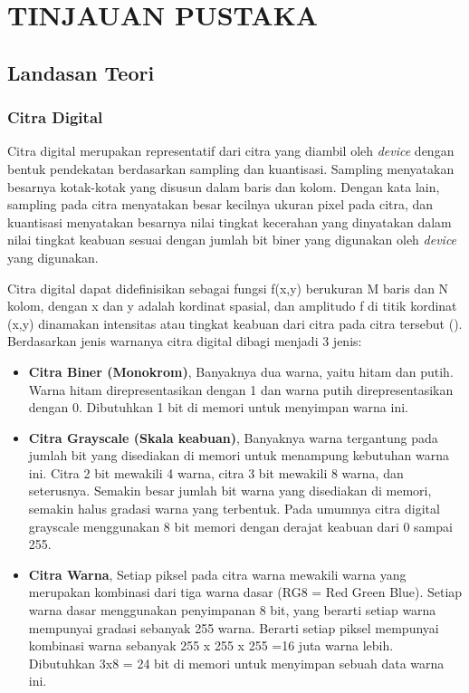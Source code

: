 
\chapter{TINJAUAN PUSTAKA}

\section{Landasan Teori}

\subsection{Citra Digital}
Citra digital merupakan representatif dari citra yang diambil oleh \textit{device} dengan bentuk pendekatan berdasarkan sampling dan kuantisasi. Sampling menyatakan besarnya kotak-kotak yang disusun dalam baris dan kolom. Dengan kata lain, sampling pada citra menyatakan besar kecilnya ukuran pixel pada citra, dan kuantisasi menyatakan besarnya nilai tingkat kecerahan yang dinyatakan dalam nilai tingkat keabuan sesuai dengan jumlah bit biner yang digunakan oleh \textit{device} yang digunakan. 

Citra digital dapat didefinisikan sebagai fungsi f(x,y) berukuran M baris dan N kolom, dengan x dan y adalah kordinat spasial, dan amplitudo f di titik kordinat (x,y) dinamakan intensitas atau tingkat keabuan dari citra pada citra tersebut (\cite{book:darma}). Berdasarkan jenis warnanya citra digital dibagi menjadi 3 jenis:

\begin{itemize}
    \item \textbf{Citra Biner (Monokrom)}, Banyaknya dua warna, yaitu hitam dan putih. Warna hitam direpresentasikan dengan 1 dan warna putih direpresentasikan dengan 0. Dibutuhkan 1 bit di memori untuk menyimpan warna ini.
    \item \textbf{Citra Grayscale (Skala keabuan)}, Banyaknya warna tergantung pada jumlah bit yang disediakan di memori untuk menampung kebutuhan warna ini. Citra 2 bit mewakili 4 warna, citra 3 bit mewakili 8 warna, dan seterusnya. Semakin besar jumlah bit warna yang disediakan di memori, semakin halus gradasi warna yang terbentuk. Pada umumnya citra digital grayscale menggunakan 8 bit memori dengan derajat keabuan dari 0 sampai 255.
    \item \textbf{Citra Warna}, Setiap piksel pada citra warna mewakili warna yang merupakan kombinasi dari tiga warna dasar (RG8 = Red Green Blue). Setiap warna dasar menggunakan penyimpanan 8 bit, yang berarti setiap warna mempunyai gradasi sebanyak 255 warna. Berarti setiap piksel mempunyai kombinasi warna sebanyak 255 x 255 x 255 =16 juta warna lebih. Dibutuhkan 3x8 = 24 bit di memori untuk menyimpan sebuah data warna ini.
\end{itemize}

